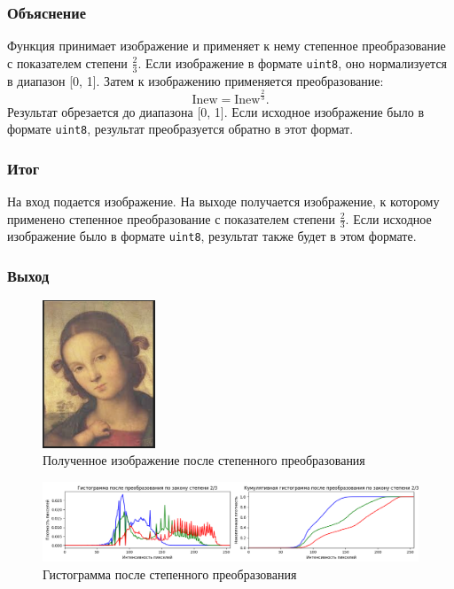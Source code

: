 \documentclass[a4paper,12pt]{article}
\begin{document}
\subsubsection{Объяснение}
Функция принимает изображение и применяет к нему степенное преобразование с показателем степени \( \frac{2}{3} \). Если изображение в формате \texttt{uint8}, оно нормализуется в диапазон [0, 1]. Затем к изображению применяется преобразование:
\[
\text{Inew} = \text{Inew}^{\frac{2}{3}}.
\]
Результат обрезается до диапазона [0, 1]. Если исходное изображение было в формате \texttt{uint8}, результат преобразуется обратно в этот формат.

\subsubsection{Итог}
На вход подается изображение. На выходе получается изображение, к которому применено степенное преобразование с показателем степени \( \frac{2}{3} \). Если исходное изображение было в формате \texttt{uint8}, результат также будет в этом формате.

\subsubsection{Выход}

\begin{figure}[H]
    \centering
    \includegraphics[width=0.3\textwidth]{im/imСтепенное.png}
    \caption{Полученное изображение после степенного преобразования}
    \label{fig:power_law_image}
\end{figure}

\begin{figure}[H]
    \centering
    \includegraphics[width=1\textwidth]{im/гистограммаСтепенное.png}
    \caption{Гистограмма после степенного преобразования}
    \label{fig:power_law_histogram}
\end{figure}
\end{document}
